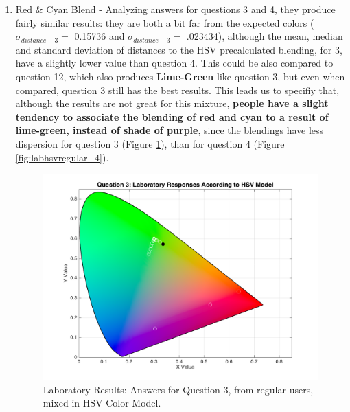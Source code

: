 %
\begin{enumerate}
  \item \ul{Red \& Cyan Blend} - Analyzing answers for questions 3 and 4, they produce fairly similar results: they are both a bit far from the expected colors ($\sigma_{distance-3} = $ 0.15736 and $\sigma_{distance-3} = $ .023434), although the mean, median and standard
  deviation of distances to the HSV precalculated blending, for 3, have a slightly lower value than question 4. This could be also compared to question 12, which also produces \textbf{Lime-Green} like question 3, but even when compared, question 3 still has the best results.
  This leads us to specifiy that, although the results are not great for this mixture, \textbf{people have a slight tendency to associate the blending of red and cyan to a result of lime-green, instead of shade of purple}, since the blendings have less dispersion for question 3
  (Figure \ref{fig:labhsvregular_3}), than for question 4 (Figure \ref{fig:labhsvregular_4}).
  \begin{figure}[htbp]
    \centering
    \begin{minipage}{0.48\textwidth}
      \centering
      \includegraphics[width=\textwidth]{images/3_lab_HSVresponses.png}
      \caption[Laboratory Results: Answers for Question 3, from regular users, mixed in HSV Color Model.]{Laboratory Results: Answers for Question 3, from regular users, mixed in HSV Color Model.}
      \label{fig:labhsvregular_3}
    \end{minipage}\hfill
    \begin{minipage}{0.48\textwidth}
      \centering

\end{minipage}
\end{figure}
\end{enumerate}
